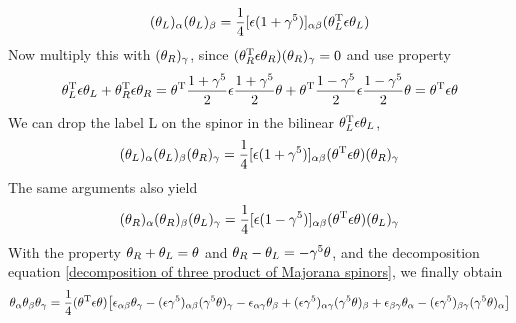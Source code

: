\begin{equation}\label{product of two sL}
(\theta_L)_{\alpha}(\theta_L)_{\beta} 
= \frac{1}{4}[\epsilon(1+\gamma^{5})]_{\alpha\beta}
(\theta_L^{\text{T}}\epsilon \theta_L)
\end{equation}
Now multiply this with $(\theta_R)_{\gamma}$, since $(\theta_R^{\text{T}}\epsilon\theta_R)(\theta_R)_\gamma = 0$ and use property
\begin{equation}\label{decomposition rule for Majorana bilinear with matrice e}
\theta_L^{\text{T}}\epsilon\theta_L + \theta_R^{\text{T}}\epsilon\theta_R 
= \theta^{\text{T}}\frac{1+\gamma^5}{2}\epsilon
\frac{1+\gamma^5}{2}\theta
+\theta^{\text{T}}\frac{1-\gamma^5}{2}\epsilon
\frac{1-\gamma^5}{2}\theta
= \theta^{\text{T}} \epsilon \theta
\end{equation}
We can drop the label L on the spinor in the bilinear $\theta_L^{\text{T}}\epsilon \theta_L$,
\begin{equation}
(\theta_L)_{\alpha}(\theta_L)_{\beta}(\theta_R)_\gamma 
= \frac{1}{4}[\epsilon(1+\gamma^{5})]_{\alpha\beta}
(\theta^{\text{T}}\epsilon \theta)(\theta_R)_\gamma
\end{equation}
The same arguments also yield
\begin{equation}
(\theta_R)_{\alpha}(\theta_R)_{\beta}(\theta_L)_\gamma 
= \frac{1}{4}[\epsilon(1-\gamma^{5})]_{\alpha\beta}
(\theta^{\text{T}}\epsilon \theta)(\theta_L)_\gamma
\end{equation}
With the property $\theta_R + \theta_L = \theta$ 
and $\theta_R - \theta_L = -\gamma^5 \theta$, and the decomposition equation \eqref{decomposition of three product of Majorana spinors}, we finally obtain
\begin{equation}\label{product of three Majorana spinor decomposition}
\theta_\alpha\theta_\beta\theta_\gamma 
= \frac{1}{4}
(\theta^{\text{T}}\epsilon \theta)
\big[
\epsilon_{\alpha\beta}\theta_{\gamma}
-(\epsilon\gamma^5)_{\alpha\beta}(\gamma^5\theta)_{\gamma}
-\epsilon_{\alpha\gamma}\theta_\beta
+(\epsilon\gamma^5)_{\alpha\gamma}(\gamma^5\theta)_\beta
+\epsilon_{\beta\gamma}\theta_\alpha
-(\epsilon\gamma^5)_{\beta\gamma}(\gamma^5\theta)_\alpha
\big]
\end{equation}

